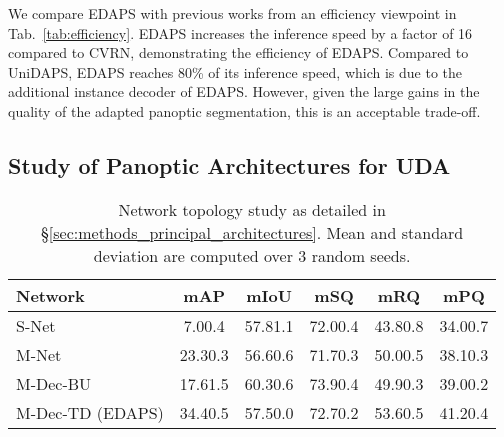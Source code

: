 \documentclass[10pt,twocolumn,letterpaper]{article}
\newcommand{\spm}[1]{\tiny{#1}}
\begin{document}
We compare EDAPS with previous works from an efficiency viewpoint in Tab.~\ref{tab:efficiency}. EDAPS increases the inference speed by a factor of 16 compared to CVRN, demonstrating the efficiency of EDAPS. Compared to UniDAPS, EDAPS reaches 80\% of its inference speed, which is due to the additional instance decoder of EDAPS. However, given the large gains in the quality of the adapted panoptic segmentation, this is an acceptable trade-off.


\subsection{Study of Panoptic Architectures for UDA}
\label{sec:network_study}
\begingroup
\setlength{\tabcolsep}{3.5pt} 
\renewcommand{\arraystretch}{1.3}
\begin{table}
\centering
\caption{
Network topology study as detailed in \S\ref{sec:methods_principal_architectures}. Mean and standard deviation are computed over 3 random seeds.
}
\footnotesize
\setlength\tabcolsep{1px}
\begin{tabular}{l @{\quad} ccccc}

\toprule 

Network
& mAP & mIoU & mSQ & mRQ & mPQ \\

\midrule

S-Net
& 7.0\spm{0.4} 
& 57.8\spm{1.1}  
& 72.0\spm{0.4} 
& 43.8\spm{0.8} 
& 34.0\spm{0.7} 
\\

M-Net
& 23.3\spm{0.3} 
& 56.6\spm{0.6} 
& 71.7\spm{0.3} 
& 50.0\spm{0.5} 
& 38.1\spm{0.3} 
\\

M-Dec-BU      
& 17.6\spm{1.5} 
& 60.3\spm{0.6} 
& 73.9\spm{0.4} 
& 49.9\spm{0.3} 
& 39.0\spm{0.2} 
\\

M-Dec-TD (EDAPS)
& 34.4\spm{0.5} 
& 57.5\spm{0.0} 
& 72.7\spm{0.2} 
& 53.6\spm{0.5} 
& 41.2\spm{0.4} 
\\
\bottomrule
\end{tabular}



 \label{tab:network_study}
\end{table}
\endgroup
\end{document}

